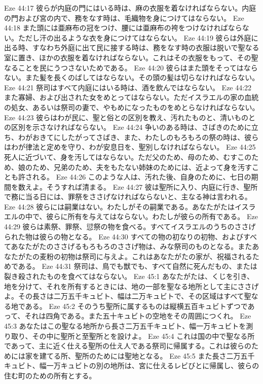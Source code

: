 Eze 44:17  彼らが内庭の門にはいる時は、麻の衣服を着なければならない。内庭の門および宮の内で、務をなす時は、毛織物を身につけてはならない。
Eze 44:18  また頭には亜麻布の冠をつけ、腰には亜麻布の袴をつけなければならない。ただし汗の出るような衣を身につけてはならない。
Eze 44:19  彼らは外庭に出る時、すなわち外庭に出て民に接する時は、務をなす時の衣服は脱いで聖なる室に置き、ほかの衣服を着なければならない。これはその衣服をもって、その聖なることを民にうつさないためである。
Eze 44:20  彼らはまた頭をそってはならない。また髪を長くのばしてはならない。その頭の髪は切らなければならない。
Eze 44:21  祭司はすべて内庭にはいる時は、酒を飲んではならない。
Eze 44:22  また寡婦、および出された女をめとってはならない。ただイスラエルの家の血統の処女、あるいは祭司の妻で、やもめになったものをめとらなければならない。
Eze 44:23  彼らはわが民に、聖と俗との区別を教え、汚れたものと、清いものとの区別を示さなければならない。
Eze 44:24  争いのある時は、さばきのために立ち、わがおきてにしたがってさばき、また、わたしのもろもろの祭の時は、彼らはわが律法と定めを守り、わが安息日を、聖別しなければならない。
Eze 44:25  死人に近づいて、身を汚してはならない。ただ父のため、母のため、むすこのため、娘のため、兄弟のため、夫をもたない姉妹のためには、近よって身を汚すことも許される。
Eze 44:26  このような人は、汚れた後、自身のために、七日の期間を数えよ。そうすれば清まる。
Eze 44:27  彼は聖所に入り、内庭に行き、聖所で務に当る日には、罪祭をささげなければならないと、主なる神は言われる。
Eze 44:28  彼らには嗣業はない。わたしがその嗣業である。あなたがたはイスラエルの中で、彼らに所有を与えてはならない。わたしが彼らの所有である。
Eze 44:29  彼らは素祭、罪祭、愆祭の物を食べる。すべてイスラエルのうちのささげられた物は彼らの物となる。
Eze 44:30  すべての物の初なりの初物、およびすべてあなたがたのささげるもろもろのささげ物は、みな祭司のものとなる。またあなたがたの麦粉の初物は祭司に与えよ。これはあなたがたの家が、祝福されるためである。
Eze 44:31  祭司は、鳥でも獣でも、すべて自然に死んだもの、または裂き殺されたものを食べてはならない。
Eze 45:1  あなたがたは、くじを引き、地を分けて、それを所有するときには、地の一部を聖なる地所として主にささげよ。その長さは二万五千キュビト、幅は二万キュビトで、その区域はすべて聖なる地である。
Eze 45:2  そのうち聖所に属するものは縦横五百キュビトずつであって、それは四角である。また五十キュビトの空地をその周囲につくれ。
Eze 45:3  あなたはこの聖なる地所から長さ二万五千キュビト、幅一万キュビトを測り取り、その中に聖所と至聖所とを設けよ。
Eze 45:4  これは国の中で聖なる所であって、主に近く仕える聖所の仕え人である祭司に帰属する。これは彼らのためには家を建てる所、聖所のためには聖地となる。
Eze 45:5  また長さ二万五千キュビト、幅一万キュビトの別の地所は、宮に仕えるレビびとに帰属し、彼らの住む町のための所有とする。

